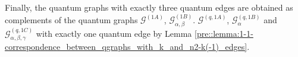 \documentclass{amsart}
\newcommand{\comments}[1]{}
\begin{document}

Finally, the quantum graphs with exactly three quantum edges are obtained as complements of the quantum graphs $\mathcal{G}^{(1A)}$, $\mathcal{G}_{\alpha,\beta}^{(1B)}$. $\mathcal{G}^{(q,1A)}$, $\mathcal{G}_{\alpha}^{(q,1B)}$ and $\mathcal{G}_{\alpha,\beta,\gamma}^{(q,1C)}$ with exactly one quantum edge by Lemma \ref{pre::lemma:1-1-correspondence_between_qgraphs_with_k_and_n2-k(-1)_edges}.


\comments{
The complete classification is summarized in the Table \ref{tabular:tracial_QG} and Table \ref{tabular:non-tracial_QG}. Table \ref{tabular:tracial_QG} lists all (tracial) quantum graphs on $(M_2,\tau)$ up to isomorphism where Table \ref{tabular:non-tracial_QG} lists all (nontracial) quantum graphs on $(M_2,\psi_q)$ for $q\in(0,1)$ up to isomorphism. 
We denote $\beta_+=1+\beta$ and $\beta_-\vcentcolon=1-\beta$. 
}
\end{document}
